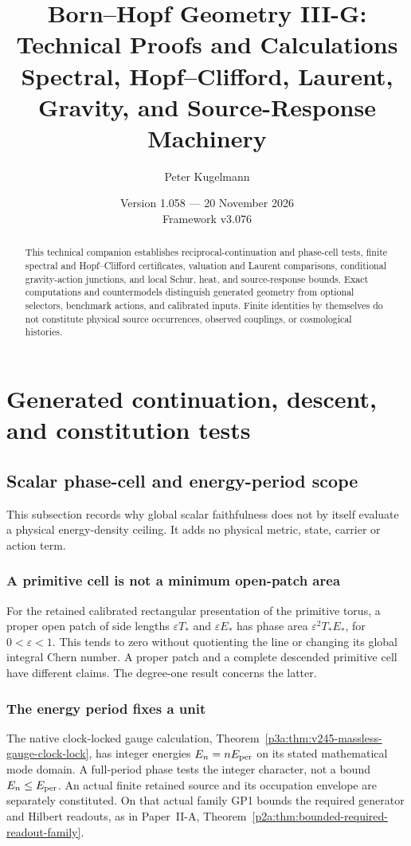 \documentclass[11pt,a4paper]{article}
\title{\textbf{Born--Hopf Geometry III-G: Technical Proofs and Calculations}\\[0.5em]
\large Spectral, Hopf--Clifford, Laurent, Gravity, and Source-Response Machinery}
\author{Peter Kugelmann}
\date{Version 1.058 --- 20 November 2026 \\ Framework v3.076}
\begin{document}
\maketitle
\begin{abstract}
This technical companion establishes reciprocal-continuation and phase-cell tests, finite spectral and Hopf--Clifford certificates, valuation and Laurent comparisons, conditional gravity-action junctions, and local Schur, heat, and source-response bounds. Exact computations and countermodels distinguish generated geometry from optional selectors, benchmark actions, and calibrated inputs. Finite identities by themselves do not constitute physical source occurrences, observed couplings, or cosmological histories.
\end{abstract}
\tableofcontents
\clearpage

\section{Generated continuation, descent, and constitution tests}
\label{p3g:sec:constitution}
\subsection{Scalar phase-cell and energy-period scope}
\label{p3a:app:scalar-cell-energy-scope}
This subsection records why global scalar faithfulness does not by itself
evaluate a physical energy-density ceiling. It adds no physical metric,
state, carrier or action term.

\subsubsection{A primitive cell is not a minimum open-patch area}
For the retained calibrated rectangular presentation of the primitive torus,
a proper open patch of side lengths \(\varepsilon T_*\) and
\(\varepsilon E_*\) has phase area
\(\varepsilon^2 T_*E_*\), for \(0<\varepsilon<1\).
This tends to zero without quotienting the line or changing its global
integral Chern number. A proper patch and a complete descended primitive
cell have different claims. The degree-one result concerns the latter.

\subsubsection{The energy period fixes a unit}
The native clock-locked gauge calculation,
Theorem~\ref{p3a:thm:v245-massless-gauge-clock-lock}, has integer energies
\(E_n=nE_{\rm per}\) on its stated mathematical mode domain. A full-period
phase tests the integer character, not a bound \(E_n\leq E_{\rm per}\).
An actual finite retained source and its occupation envelope are separately
constituted. On that actual family GP1 bounds the required generator and
Hilbert readouts, as in Paper~II-A,
Theorem~\ref{p2a:thm:bounded-required-readout-family}.
\end{document}
